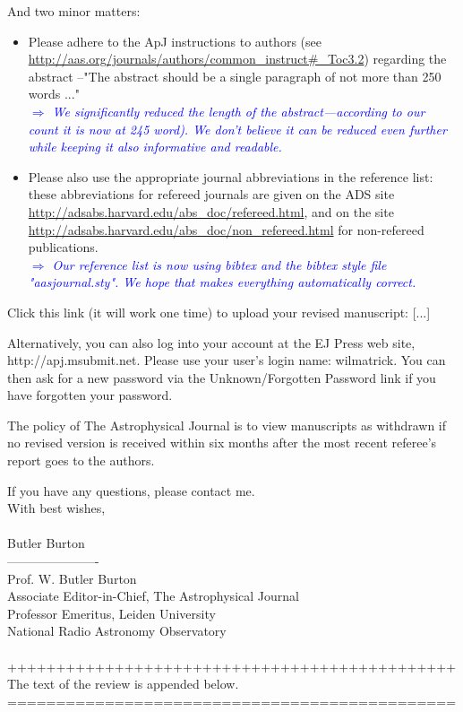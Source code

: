 \documentclass[10pt,a4paper]{article}
\newcommand{\Comment}[1]{\textsl{\textcolor{Blue}{$\Longrightarrow$ {#1}}}}
\begin{document}
And two minor matters: 
\begin{itemize}
\item Please adhere to the ApJ instructions to authors (see\\ \url{http://aas.org/journals/authors/common_instruct#_Toc3.2}) regarding the abstract --"The abstract should be a single paragraph of not more than 250 words ..." \\\Comment{We significantly reduced the length of the abstract---according to our count it is now at 245 word). We don't believe it can be reduced even further while keeping it also informative and readable.}
\item Please also use the appropriate journal abbreviations in the reference list: these abbreviations for refereed journals are given on the ADS site \url{http://adsabs.harvard.edu/abs_doc/refereed.html}, and on the site
\url{http://adsabs.harvard.edu/abs_doc/non_refereed.html} for non-refereed publications. \\\Comment{Our reference list is now using bibtex and the bibtex style file "aasjournal.sty". We hope that makes everything automatically correct.}
\end{itemize}

Click this link (it will work one time) to upload your revised manuscript: [...]

Alternatively, you can also log into your account at the EJ Press web site,
http://apj.msubmit.net.  Please use your user's login name: wilmatrick.  You can
then ask for a new password via the Unknown/Forgotten Password link if you have
forgotten your password. 

The policy of The Astrophysical Journal is to view manuscripts as withdrawn if no
revised version is received within six months after the most recent referee's report
goes to the authors.

If you have any questions, please contact me.\\


\noindent With best wishes,\\\\
Butler Burton\\
----------------------\\
Prof. W. Butler Burton\\
Associate Editor-in-Chief, The Astrophysical Journal\\
Professor Emeritus, Leiden University\\
National Radio Astronomy Observatory\\
\\++++++++++++++++++++++++++++++++++++++++++++++\\
The text of the review is appended below.\\
==============================================\\\\ 
  
\end{document}
